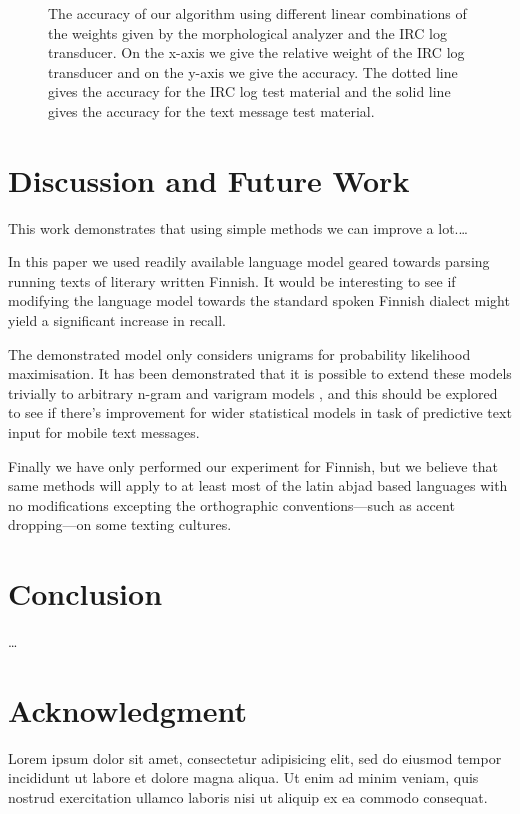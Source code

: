 \documentclass[a4paper,conference]{IEEEtran}
\begin{document}
\begin{figure*}[!t]
\centerline{
\hfil
{}}
\caption{The accuracy of our algorithm using different linear combinations of the weights given by the morphological analyzer and the IRC log transducer. On the x-axis we give the relative weight of the IRC log transducer and on the y-axis we give the accuracy. The dotted line gives the accuracy for the IRC log test material and the solid line gives the accuracy for the text message test material.}
\label{AccuraciesIRCMaterial}
\end{figure*}

\section{Discussion and Future Work}
\label{sec:discussion}

This work demonstrates that using simple methods we can improve a lot.\ldots

In this paper we used readily available language model geared towards parsing
running texts of literary written Finnish. It would be interesting to see if
modifying the language model towards the standard spoken Finnish dialect
might yield a significant increase in recall.

The demonstrated model only considers unigrams for probability
likelihood maximisation. It has been demonstrated that it is possible
to extend these models trivially to arbitrary n-gram and varigram
models \cite{Silfverberg/2011}, and this should be explored to see if
there's improvement for wider statistical models in task of predictive
text input for mobile text messages.

Finally we have only performed our experiment for Finnish, but we believe that
same methods will apply to at least most of the latin abjad based languages
with no modifications excepting the orthographic conventions---such as accent
dropping---on some texting cultures.

\section{Conclusion}
\label{sec:conclusions}

\ldots \balance
\section*{Acknowledgment}
Lorem ipsum dolor sit amet, consectetur adipisicing elit, sed do eiusmod tempor incididunt ut labore et dolore magna aliqua. Ut enim ad minim veniam, quis nostrud exercitation ullamco laboris nisi ut aliquip ex ea commodo consequat.

\






\end{document}
